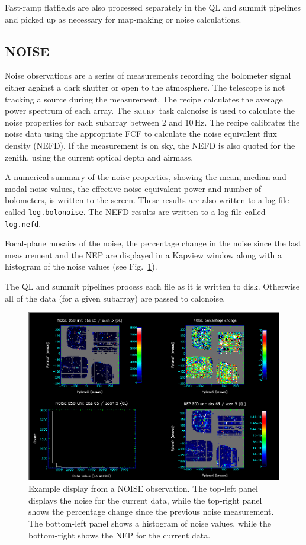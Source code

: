 \documentclass[twoside,11pt]{article}
\renewcommand{\_}{\texttt{\symbol{95}}}
\newcommand{\SMURF}{\textsc{smurf}}
\newcommand{\task}[1]{\textsf{#1}}
\begin{document}
Fast-ramp flatfields are also processed separately in the QL and
summit pipelines and picked up as necessary for map-making or noise
calculations.

\subsection{NOISE}

Noise observations are a series of measurements recording the
bolometer signal either against a dark shutter or open to the
atmosphere. The telescope is not tracking a source during the
measurement. The recipe calculates the average power spectrum of each
array. The \SMURF\ task \task{calcnoise} is used to calculate the
noise properties for each subarray between 2 and 10\,Hz. The recipe
calibrates the noise data using the appropriate FCF to calculate the
noise equivalent flux density (NEFD). If the measurement is on sky,
the NEFD is also quoted for the zenith, using the current optical
depth and airmass.

A numerical summary of the noise properties, showing the mean, median
and modal noise values, the effective noise equivalent power and
number of bolometers, is written to the screen. These results are also
written to a log file called \verb+log.bolonoise+. The NEFD results
are written to a log file called \verb+log.nefd+.

Focal-plane mosaics of the noise, the percentage change in the noise
since the last measurement and the NEP are displayed in a Kapview
window along with a histogram of the noise values (see
Fig.~\ref{fig:noise}).

The QL and summit pipelines process each file as it is written to
disk. Otherwise all of the data (for a given subarray) are passed to
\task{calcnoise}.

\begin{figure}[t]
\centering
\includegraphics[width=\textwidth]{sun264_noise}
\caption{Example display from a NOISE observation. The top-left panel
  displays the noise for the current data, while the top-right panel
  shows the percentage change since the previous noise
  measurement. The bottom-left panel shows a histogram of noise
  values, while the bottom-right shows the NEP for the current
  data.\label{fig:noise}}
\end{figure}
\end{document}
